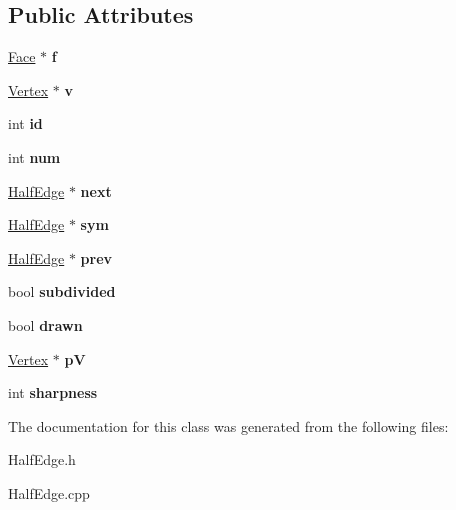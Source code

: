 \subsection*{Public Attributes}
\begin{DoxyCompactItemize}
\item 
\hypertarget{class_half_edge_a54d9f243ea78bec79dcf983b81447fa1}{\hyperlink{class_face}{Face} $\ast$ {\bfseries f}}\label{class_half_edge_a54d9f243ea78bec79dcf983b81447fa1}

\item 
\hypertarget{class_half_edge_ac239343aea2159d5958fc9eac51389d4}{\hyperlink{class_vertex}{Vertex} $\ast$ {\bfseries v}}\label{class_half_edge_ac239343aea2159d5958fc9eac51389d4}

\item 
\hypertarget{class_half_edge_ab9ecb70584bea2c29db6fe71961607bb}{int {\bfseries id}}\label{class_half_edge_ab9ecb70584bea2c29db6fe71961607bb}

\item 
\hypertarget{class_half_edge_a428a6d8f4c327209e9924cb82111b15e}{int {\bfseries num}}\label{class_half_edge_a428a6d8f4c327209e9924cb82111b15e}

\item 
\hypertarget{class_half_edge_a5918db069bb8b4a89e471c01a14fc6e1}{\hyperlink{class_half_edge}{Half\-Edge} $\ast$ {\bfseries next}}\label{class_half_edge_a5918db069bb8b4a89e471c01a14fc6e1}

\item 
\hypertarget{class_half_edge_aa0922243c77e28cd506e6c27e606e775}{\hyperlink{class_half_edge}{Half\-Edge} $\ast$ {\bfseries sym}}\label{class_half_edge_aa0922243c77e28cd506e6c27e606e775}

\item 
\hypertarget{class_half_edge_a02bbf630ad01fd4d7bf4af38e286844e}{\hyperlink{class_half_edge}{Half\-Edge} $\ast$ {\bfseries prev}}\label{class_half_edge_a02bbf630ad01fd4d7bf4af38e286844e}

\item 
\hypertarget{class_half_edge_a5ec231e66256c274e66511fcd9ffe11c}{bool {\bfseries subdivided}}\label{class_half_edge_a5ec231e66256c274e66511fcd9ffe11c}

\item 
\hypertarget{class_half_edge_adc3784e818ea48610216d5498340866b}{bool {\bfseries drawn}}\label{class_half_edge_adc3784e818ea48610216d5498340866b}

\item 
\hypertarget{class_half_edge_acbb6e5a082bc2d57fa994de5301fc5e0}{\hyperlink{class_vertex}{Vertex} $\ast$ {\bfseries p\-V}}\label{class_half_edge_acbb6e5a082bc2d57fa994de5301fc5e0}

\item 
\hypertarget{class_half_edge_a74a4b1f0a2e4442118b31e3bbe872b82}{int {\bfseries sharpness}}\label{class_half_edge_a74a4b1f0a2e4442118b31e3bbe872b82}

\end{DoxyCompactItemize}


The documentation for this class was generated from the following files\-:\begin{DoxyCompactItemize}
\item 
Half\-Edge.\-h\item 
Half\-Edge.\-cpp\end{DoxyCompactItemize}
